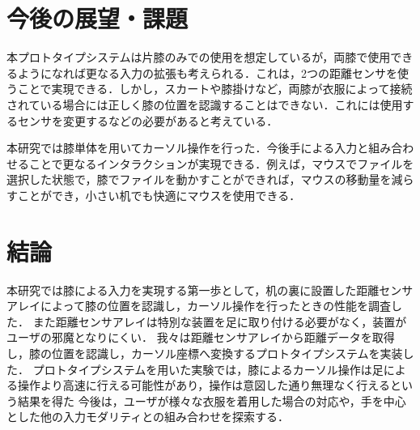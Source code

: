\documentclass[submit, techrep]{ipsj}
\begin{document}
\section{今後の展望・課題}
本プロトタイプシステムは片膝のみでの使用を想定しているが，両膝で使用できるようになれば更なる入力の拡張も考えられる．これは，2つの距離センサを使うことで実現できる．しかし，スカートや膝掛けなど，両膝が衣服によって接続されている場合には正しく膝の位置を認識することはできない．これには使用するセンサを変更するなどの必要があると考えている．\par
本研究では膝単体を用いてカーソル操作を行った．今後手による入力と組み合わせることで更なるインタラクションが実現できる．例えば，マウスでファイルを選択した状態で，膝でファイルを動かすことができれば，マウスの移動量を減らすことができ，小さい机でも快適にマウスを使用できる．\par

\section{結論}
本研究では膝による入力を実現する第一歩として，机の裏に設置した距離センサアレイによって膝の位置を認識し，カーソル操作を行ったときの性能を調査した．
また距離センサアレイは特別な装置を足に取り付ける必要がなく，装置がユーザの邪魔となりにくい．
我々は距離センサアレイから距離データを取得し，膝の位置を認識し，カーソル座標へ変換するプロトタイプシステムを実装した．
プロトタイプシステムを用いた実験では，膝によるカーソル操作は足による操作より高速に行える可能性があり，操作は意図した通り無理なく行えるという結果を得た
今後は，ユーザが様々な衣服を着用した場合の対応や，手を中心とした他の入力モダリティとの組み合わせを探索する．



%
%
%




\begin{biography}
%
%
\end{biography}
\end{document}
